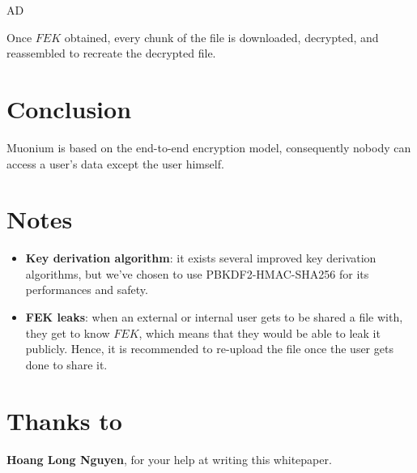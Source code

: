 AD\documentclass[a4paper,10pt]{article}
\begin{document}
Once $FEK$ obtained, every chunk of the file is downloaded, decrypted, and reassembled to recreate the
decrypted file.

\section{Conclusion}
Muonium is based on the end-to-end encryption model, consequently nobody can access a user's data except the user himself.

\section{Notes}

\begin{itemize}
	\item \textbf{Key derivation algorithm}: it exists several improved key derivation
	algorithms, but we've chosen to use PBKDF2-HMAC-SHA256 for its performances and safety.
	\item \textbf{FEK leaks}: when an external or internal user gets to be shared a file with,
	they get to know $FEK$, which means that they would be able to leak it publicly. Hence,
	it is recommended to re-upload the file once the user gets done to share it.
\end{itemize}


\section{Thanks to}

\textbf{Hoang Long Nguyen}, for your help at writing this whitepaper.


\end{document}
